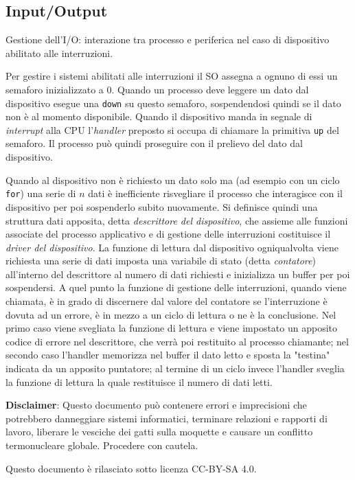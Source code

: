 \documentclass[answers,a4paper,12pt]{exam}
\begin{document}
\begin{questions}
\section{Input/Output}
\question
Gestione dell'I/O: interazione tra processo e periferica nel caso di dispositivo abilitato alle interruzioni. 
\begin{solutionorlines}[3.8in]
Per gestire i sistemi abilitati alle interruzioni il SO assegna a ognuno di essi un semaforo inizializzato a 0. Quando un processo deve leggere un dato dal dispositivo esegue una \texttt{down} su questo semaforo, sospendendosi quindi se il dato non è al momento disponibile. Quando il dispositivo manda in segnale di \textit{interrupt} alla CPU l'\textit{handler} preposto si occupa di chiamare la primitiva \texttt{up} del semaforo. Il processo può quindi proseguire con il prelievo del dato dal dispositivo. 

Quando al dispositivo non è richiesto un dato solo ma (ad esempio con un ciclo \texttt{for}) una serie di $n$ dati è inefficiente risvegliare il processo che interagisce con il dispositivo per poi sospenderlo subito nuovamente. Si definisce quindi una struttura dati apposita, detta \textit{descrittore del dispositivo}, che assieme alle funzioni associate del processo applicativo e di gestione delle interruzioni costituisce il \textit{driver del dispositivo}. La funzione di lettura dal dispositivo ogniqualvolta viene richiesta una serie di dati imposta una variabile di stato (detta \textit{contatore}) all'interno del descrittore al numero di dati richiesti e inizializza un buffer per poi sospendersi. A quel punto la funzione di gestione delle interruzioni, quando viene chiamata, è in grado di discernere dal valore del contatore se l'interruzione è dovuta ad un errore, è in mezzo a un ciclo di lettura o ne è la conclusione. Nel primo caso viene svegliata la funzione di lettura e viene impostato un apposito codice di errore nel descrittore, che verrà poi restituito al processo chiamante; nel secondo caso l'handler memorizza nel buffer il dato letto e sposta la "testina" indicata da un apposito puntatore; al termine di un ciclo invece l'handler sveglia la funzione di lettura la quale restituisce il numero di dati letti. 
\end{solutionorlines}
\end{questions}
\textbf{Disclaimer}: Questo documento può contenere errori e imprecisioni che potrebbero danneggiare sistemi informatici, terminare relazioni e rapporti di lavoro, liberare le vesciche dei gatti sulla moquette e causare un conflitto termonucleare globale. Procedere con cautela.

Questo documento è rilasciato sotto licenza CC-BY-SA 4.0. \faCreativeCommons\ \faCreativeCommonsBy\ \faCreativeCommonsSa
\end{document}
